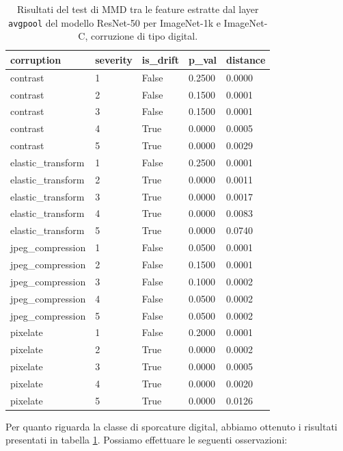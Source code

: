 \begin{table}[H]
  \centering
  \begin{tabular}{lllll}
    \toprule
    corruption & severity & is\_drift & p\_val & distance \\
    \midrule
    contrast & 1 & False & 0.2500 & 0.0000 \\ 
    contrast & 2 & False & 0.1500 & 0.0001 \\ 
    contrast & 3 & False & 0.1500 & 0.0001 \\ 
    contrast & 4 & True & 0.0000 & 0.0005 \\ 
    contrast & 5 & True & 0.0000 & 0.0029 \\ 
    elastic\_transform & 1 & False & 0.2500 & 0.0001 \\ 
    elastic\_transform & 2 & True & 0.0000 & 0.0011 \\ 
    elastic\_transform & 3 & True & 0.0000 & 0.0017 \\ 
    elastic\_transform & 4 & True & 0.0000 & 0.0083 \\ 
    elastic\_transform & 5 & True & 0.0000 & 0.0740 \\ 
    jpeg\_compression & 1 & False & 0.0500 & 0.0001 \\ 
    jpeg\_compression & 2 & False & 0.1500 & 0.0001 \\ 
    jpeg\_compression & 3 & False & 0.1000 & 0.0002 \\ 
    jpeg\_compression & 4 & False & 0.0500 & 0.0002 \\ 
    jpeg\_compression & 5 & False & 0.0500 & 0.0002 \\ 
    pixelate & 1 & False & 0.2000 & 0.0001 \\ 
    pixelate & 2 & True & 0.0000 & 0.0002 \\ 
    pixelate & 3 & True & 0.0000 & 0.0005 \\ 
    pixelate & 4 & True & 0.0000 & 0.0020 \\ 
    pixelate & 5 & True & 0.0000 & 0.0126 \\ 
    \bottomrule
  \end{tabular}
\caption{Risultati del test di MMD tra le feature estratte dal layer \texttt{avgpool} del modello ResNet-50 per ImageNet-1k e ImageNet-C, corruzione di tipo digital.}
\label{tab:mmd_drift_report_imagenet_c_digital}
\end{table}
Per quanto riguarda la classe di sporcature digital, abbiamo ottenuto i risultati presentati in tabella \ref{tab:mmd_drift_report_imagenet_c_digital}. Possiamo effettuare le seguenti osservazioni:
